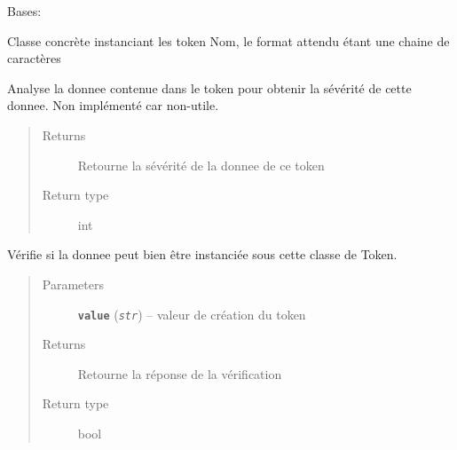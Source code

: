 \documentclass[letterpaper,10pt,english]{sphinxmanual}
\begin{document}

\begin{fulllineitems}
\label{loganalyser:loganalyser.token.Name}
Bases: {\hyperref[loganalyser:loganalyser.token.Token]{\emph{}}}

Classe concrète instanciant les token Nom, le format attendu étant une chaine de caractères

\begin{fulllineitems}
\label{loganalyser:loganalyser.token.Name._Token__analyse}
Analyse la donnee contenue dans le token pour obtenir la sévérité de cette donnee. Non implémenté car non-utile.
\begin{quote}\begin{description}
\item[{Returns}] \leavevmode
Retourne la sévérité de la donnee de ce token

\item[{Return type}] \leavevmode
int

\end{description}\end{quote}

\end{fulllineitems}


\begin{fulllineitems}
\label{loganalyser:loganalyser.token.Name._Token__verifier_type}
Vérifie si la donnee peut bien être instanciée sous cette classe de Token.
\begin{quote}\begin{description}
\item[{Parameters}] \leavevmode
\textbf{\texttt{value}} (\emph{\texttt{str}}) -- valeur de création du token

\item[{Returns}] \leavevmode
Retourne la réponse de la vérification

\item[{Return type}] \leavevmode
bool

\end{description}\end{quote}

\end{fulllineitems}


\end{fulllineitems}
\end{document}
